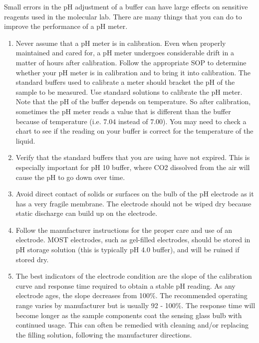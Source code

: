 \documentclass[11pt, oneside]{article}
\begin{document}
		\begin{center}
	
			\hspace{1in}
	
			Small errors in the pH adjustment of a buffer can have large effects on sensitive reagents used in the molecular lab. There are many things 			that you can do to improve the performance of a pH meter. 
	
		\end{center}		

		\begin{enumerate}		
			\item Never assume that a pH meter is in calibration. Even when properly maintained and cared for, a pH meter undergoes considerable 				drift in a matter of hours after calibration. Follow the appropriate SOP to determine whether your pH meter is in calibration and to bring it 				into calibration. The standard buffers used to calibrate a meter should bracket the pH of the sample to be measured. Use standard solutions 			to calibrate the pH meter. Note that the pH of the buffer depends on temperature.  So after calibration, sometimes the pH meter reads a 				value that is different than the buffer because of temperature (i.e. 7.04 instead of 7.00). You may need to check a chart to see if the reading 			on your buffer is correct for the temperature of the liquid.
			\item Verify that the standard buffers that you are using have not expired. This is especially important for pH 10 buffer, where CO2 dissolved 			from the air will cause the pH to go down over time. 
			\item Avoid direct contact of solids or surfaces on the bulb of the pH electrode as it has a very fragile membrane. The electrode should not 			be wiped dry because static discharge can build up on the electrode. 
			\item Follow the manufacturer instructions for the proper care and use of an electrode. MOST electrodes, such as gel-filled electrodes, 				should be stored in pH storage solution (this is typically pH 4.0 buffer), and will be ruined if stored dry. 
			\item The best indicators of the electrode condition are the slope of the calibration curve and response time required to obtain a stable pH 			reading. As any electrode ages, the slope decreases from 100\%. The recommended operating range varies by manufacturer but is usually 			92 - 100\%. The response time will become longer as the sample components coat the sensing glass bulb with continued usage. This can 			often be remedied with cleaning and/or replacing the filling solution, following the manufacturer directions. 
		\end{enumerate}
\end{document}
